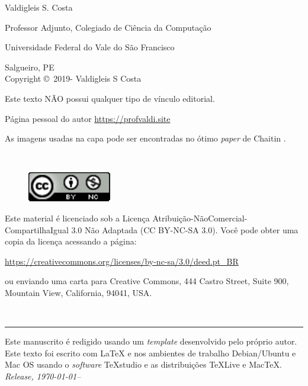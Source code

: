 \newpage
\noindent Valdigleis S. Costa

\noindent Professor Adjunto, Colegiado de Ciência da Computação

\noindent Universidade Federal do Vale do São Francisco

\noindent Salgueiro, PE\\

\noindent Copyright \copyright\ 2019-{\the\year} Valdigleis S Costa

\noindent Este texto  \textsc{NÃO}  possui qualquer tipo de vínculo editorial.

\noindent Página pessoal do autor \url{https://profvaldi.site}

\noindent As imagens usadas na capa pode ser encontradas no ótimo \textit{paper} de Chaitin \cite{chaitin2002figures}.

~\vfill

\thispagestyle{empty}


\begin{figure}[h]
	\centering
	\includegraphics[width=0.15\linewidth]{figures/license}
\end{figure}
\noindent Este material é licenciado sob a Licença Atribuição-NãoComercial-CompartilhaIgual 3.0 Não Adaptada (CC BY-NC-SA 3.0).  Você pode obter uma copia da licença acessando a página: 
\begin{center}
	\url{https://creativecommons.org/licenses/by-nc-sa/3.0/deed.pt_BR}
\end{center}
\noindent ou enviando uma carta para Creative Commons, 444 Castro Street, Suite 900, Mountain View, California, 94041, USA.

~\vfill

\thispagestyle{empty}

\hrule
\vspace*{1cm}

\noindent Este manuscrito é redigido usando um \textit{template} desenvolvido pelo próprio autor. Este texto foi escrito com {\LaTeX} e {\LaTeXe} nos ambientes de trabalho Debian/Ubuntu e Mac OS usando o \textit{software} TeXstudio e as distribuições  {\TeX}Live e Mac{\TeX}. \\ 

\noindent \textit{Release, \today--\currenttime} %
\newpage